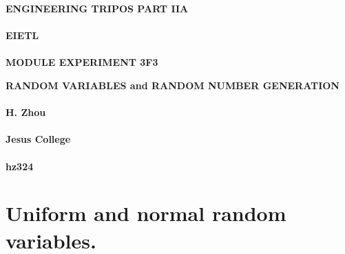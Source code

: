 \documentclass[12pt]{article}
\begin{document}
\noindent
\vspace{3.6cm}
\begin{center}
{\bf ENGINEERING TRIPOS PART IIA\\\hfill \\
EIETL \\\hfill \\MODULE EXPERIMENT 3F3}
\end{center}
\vspace{0.5cm}
\begin{center}
{\bf RANDOM VARIABLES and RANDOM NUMBER GENERATION\\\hfill\\ H. Zhou \\\hfill\\
Jesus College \\\hfill
\\
hz324
}
\end{center}
\vspace{1.6cm}
\begin{center}
\end{center}
\pagebreak
\section{\bf Uniform and normal random variables.}
\end{document}
